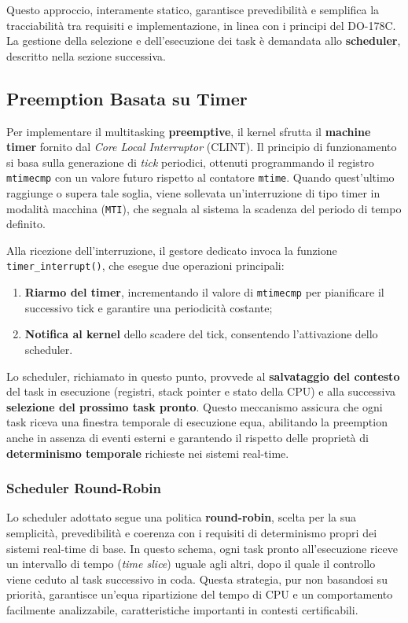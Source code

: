 \documentclass[italian, Lau, oneside]{sapthesis} %
\begin{document}
Questo approccio, interamente statico, garantisce prevedibilità e semplifica la tracciabilità tra requisiti e implementazione, in linea con i principi del DO-178C.  
La gestione della selezione e dell’esecuzione dei task è demandata allo \textbf{scheduler}, descritto nella sezione successiva.

\subsection{Preemption Basata su Timer}

Per implementare il multitasking \textbf{preemptive}, il kernel sfrutta il \textbf{machine timer} fornito dal \emph{Core Local Interruptor} (CLINT).  
Il principio di funzionamento si basa sulla generazione di \emph{tick} periodici, ottenuti programmando il registro \texttt{mtimecmp} con un valore futuro rispetto al contatore \texttt{mtime}. Quando quest’ultimo raggiunge o supera tale soglia, viene sollevata un’interruzione di tipo timer in modalità macchina (\texttt{MTI}), che segnala al sistema la scadenza del periodo di tempo definito.

Alla ricezione dell’interruzione, il gestore dedicato invoca la funzione \texttt{timer\_interrupt()}, che esegue due operazioni principali:  
\begin{enumerate}
    \item \textbf{Riarmo del timer}, incrementando il valore di \texttt{mtimecmp} per pianificare il successivo tick e garantire una periodicità costante;  
    \item \textbf{Notifica al kernel} dello scadere del tick, consentendo l’attivazione dello scheduler.
\end{enumerate}

Lo scheduler, richiamato in questo punto, provvede al \textbf{salvataggio del contesto} del task in esecuzione (registri, stack pointer e stato della CPU) e alla successiva \textbf{selezione del prossimo task pronto}.  
Questo meccanismo assicura che ogni task riceva una finestra temporale di esecuzione equa, abilitando la preemption anche in assenza di eventi esterni e garantendo il rispetto delle proprietà di \textbf{determinismo temporale} richieste nei sistemi real-time.


\subsubsection*{Scheduler Round-Robin}

Lo scheduler adottato segue una politica \textbf{round-robin}, scelta per la sua semplicità, prevedibilità e coerenza con i requisiti di determinismo propri dei sistemi real-time di base.  
In questo schema, ogni task pronto all’esecuzione riceve un intervallo di tempo (\emph{time slice}) uguale agli altri, dopo il quale il controllo viene ceduto al task successivo in coda.  
Questa strategia, pur non basandosi su priorità, garantisce un’equa ripartizione del tempo di CPU e un comportamento facilmente analizzabile, caratteristiche importanti in contesti certificabili.
\end{document}
